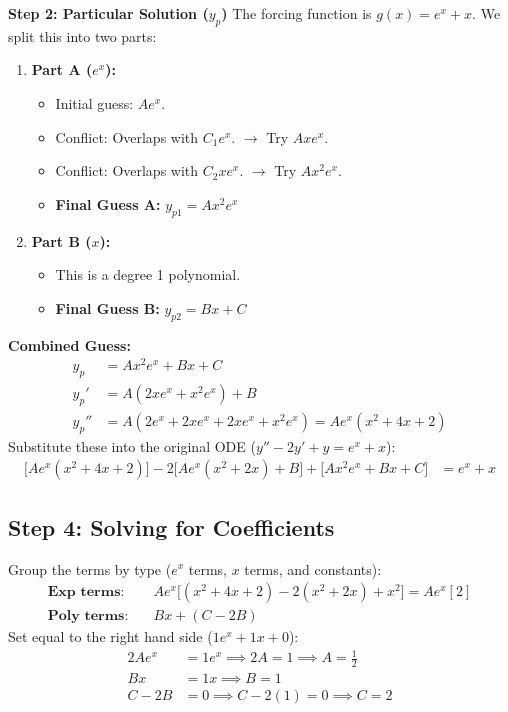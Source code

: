 \documentclass[11pt]{article}
\begin{document}
\textbf{Step 2: Particular Solution ($y_p$)}
The forcing function is $g(x) = e^x + x$. We split this into two parts:
\begin{enumerate}
    \item \textbf{Part A ($e^x$):}
    \begin{itemize}
        \item Initial guess: $A e^x$.
        \item Conflict: Overlaps with $C_1 e^x$. $\rightarrow$ Try $Ax e^x$.
        \item Conflict: Overlaps with $C_2 x e^x$. $\rightarrow$ Try $Ax^2 e^x$.
        \item \textbf{Final Guess A:} $y_{p1} = A x^2 e^x$
    \end{itemize}
    
    \item \textbf{Part B ($x$):}
    \begin{itemize}
        \item This is a degree 1 polynomial.
        \item \textbf{Final Guess B:} $y_{p2} = Bx + C$
    \end{itemize}
\end{enumerate}

\textbf{Combined Guess:}
\begin{align*}
    y_p &= A x^2 e^x + Bx + C \\
    y_p' &= A(2x e^x + x^2 e^x) + B \\
    y_p'' &= A(2e^x + 2xe^x + 2xe^x + x^2e^x) = A e^x(x^2 + 4x + 2)
\end{align*}
Substitute these into the original ODE ($y'' - 2y' + y = e^x + x$):
\begin{align*}
    \Big[ Ae^x(x^2 + 4x + 2) \Big] - 2 \Big[ Ae^x(x^2 + 2x) + B \Big] + \Big[ Ax^2e^x + Bx + C \Big] &= e^x + x
\end{align*}

\subsection*{Step 4: Solving for Coefficients}
Group the terms by type ($e^x$ terms, $x$ terms, and constants):
\begin{align*}
    \textbf{Exp terms:} \quad & Ae^x \Big[ (x^2 + 4x + 2) - 2(x^2 + 2x) + x^2 \Big] = Ae^x[2] \\
    \textbf{Poly terms:} \quad & Bx + (C - 2B)
\end{align*}
Set equal to the right hand side ($1e^x + 1x + 0$):
\begin{align*}
    2Ae^x &= 1e^x \implies 2A = 1 \implies \boxed{A = \frac{1}{2}} \\
    Bx &= 1x \implies \boxed{B = 1} \\
    C - 2B &= 0 \implies C - 2(1) = 0 \implies \boxed{C = 2}
\end{align*}
\end{document}
